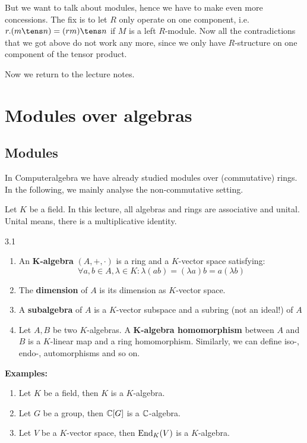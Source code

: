 \documentclass[twoside = false,	%
		headsepline,		%
		parskip = true,
		]{scrbook}						%
\begin{document}
    But we want to talk about modules, hence we have to make even more concessions. The fix is to let $R$ only operate on one component, i.e. $r.(m \tens n) = (rm) \tens n$ if $M$ is a left $R$-module. Now all the contradictions that we got above do not work any more, since we only have $R$-structure on one component of the tensor product.

    Now we return to the lecture notes.
\section{Modules over algebras}
    \subsection{Modules}
        In Computeralgebra \cite{Cobra} we have already studied modules over (commutative) rings. In the following, we mainly analyse the non-commutative setting.

        Let $K$ be a field. In this lecture, all algebras and rings are associative and unital. Unital means, there is a multiplicative identity.

        \begin{definition}{}{3.1}
            \begin{enumerate}
                \item
                    An $\mathbf{K}$\textbf{-algebra} $(A,+,\cdot)$ is a ring and a $K$-vector space satisfying:
                    \begin{equation*}
                        \forall a,b \in A, \lambda \in K: \lambda(ab) = (\lambda a)b = a (\lambda b)
                    \end{equation*}
                \item
                    The \textbf{dimension} of $A$ is its dimension as $K$-vector space.
                \item 
                    A \textbf{subalgebra} of $A$ is a $K$-vector subspace and a subring (not an ideal!) of $A$
                \item
                    Let $A,B$ be two $K$-algebras. A $\mathbf{K}$\textbf{-algebra homomorphism} between $A$ and $B$ is a $K$-linear map and a ring homomorphism. Similarly, we can define iso-, endo-, automorphisms and so on.
            \end{enumerate}
        \end{definition}
        
        \textbf{Examples:}
            \begin{enumerate}
                \item
                    Let $K$ be a field, then $K$ is a $K$-algebra.
                \item
                    Let $G$ be a group, then $\mathbb C[G]$ is a $\mathbb C$-algebra.
                \item
                    Let $V$ be a $K$-vector space, then $\mathrm{End}_K(V)$ is a $K$-algebra.
            \end{enumerate}
\end{document}
